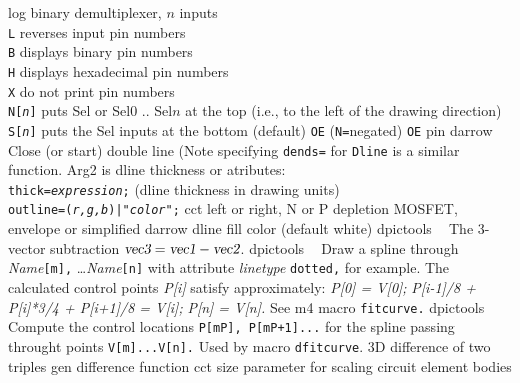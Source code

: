 %
  {log}%
  {binary demultiplexer, $n$ inputs\\
    {\tt L} reverses input pin numbers\\
    {\tt B} displays binary pin numbers\\
    {\tt H} displays hexadecimal pin numbers\\
    {\tt X} do not print pin numbers\\
    {\tt N[{\sl n}]} puts Sel or Sel$0$ .. Sel$n$ at the top
    (i.e., to the left of the drawing direction)\\
    {\tt S[{\sl n}]} puts the Sel inputs at the bottom (default)
    {\tt OE} ({\tt N=}negated) {\tt OE} pin
    }%
%
  {darrow}%
  {Close (or start) double line (Note specifying {\tt dends=} for {\tt Dline}
   is a similar function.  Arg2 is dline thickness or atributes:\\
   {\tt thick={\sl expression};} (dline thickness in drawing units)\\
   {\tt outline=({\sl r,g,b})|"{\sl color}";}}%
%
  {cct}%
  {left or right, N or P depletion MOSFET, envelope or simplified
    }%
%
  {darrow}%
  {dline fill color (default white)}%
%
  {dpictools}%
  {$\;\;$ The 3-vector subtraction
    $\hbox{\sl vec3} = \hbox{\sl vec1} - \hbox{\sl vec2}$.}%
%
  {dpictools}%
  {$\;\;$ Draw a spline through {\sl Name}{\tt [m],} \ldots {\sl Name}{\tt [n]}
   with attribute {\sl linetype} {\tt dotted,} for example.
   The calculated control points {\sl P[i]} satisfy approximately:
   {\sl P[0] = V[0];} {\sl P[i-1]/8 + P[i]*3/4 + P[i+1]/8 = V[i];}
   {\sl P[n] = V[n].}  See m4 macro {\tt fitcurve.}}%
%
  {dpictools}%
  {$\;\;$ Compute the control locations {\tt P[mP], P[mP+1]...} for
  the spline passing throught points {\tt V[m]...V[n].}  Used by
  macro {\tt dfitcurve}.}%
%
  {3D}%
  {difference of two triples}%
%
  {gen}%
  {difference function}%
%
  {cct}%
  {size parameter for scaling circuit element bodies }%
